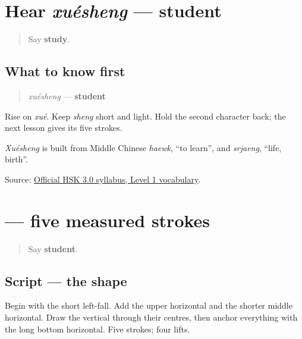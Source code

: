\section[xuésheng]{Hear \emph{xuésheng} — student}

\label{lesson:ZH-C13-hear-xuesheng}



\begin{quote}
Say \textbf{study}.
\end{quote}

\subsection*{What to know first}
\begin{quote}
\emph{xuésheng} — \textbf{student}
\end{quote}

Rise on \emph{xué}. Keep \emph{sheng} short and light. Hold the second character back; the next lesson gives its five strokes.

\emph{Xuésheng} is built from Middle Chinese \emph{haewk}, \textquotedblleft{}to learn\textquotedblright{}, and \emph{srjaeng}, \textquotedblleft{}life, birth\textquotedblright{}.

\begin{tcolorbox}[breakable,colback=teal!4,colframe=teal!35!black,title={Before you move on}]
Source: \href{https://hsk.cn-bj.ufileos.com/3.0/\%E6\%96\%B0\%E7\%89\%88HSK\%E8\%80\%83\%E8\%AF\%95\%E5\%A4\%A7\%E7\%BA\%B21219.pdf}{Official HSK 3.0 syllabus, Level 1 vocabulary}.
\end{tcolorbox}
\section[\texorpdfstring{\zh{生} (sheng)}{生 (sheng)}]{ — five measured strokes}

\label{lesson:ZH-W13-sheng}



\begin{quote}
Say \textbf{student}.
\end{quote}

\subsection*{Script — the shape}

Begin with the short left-fall. Add the upper horizontal and the shorter middle horizontal. Draw the vertical through their centres, then anchor everything with the long bottom horizontal. Five strokes; four lifts.

